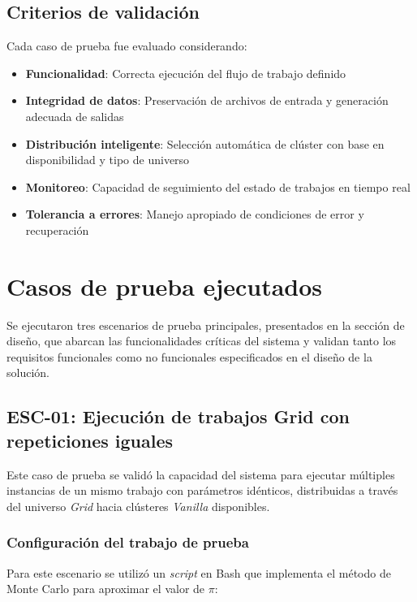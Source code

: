 \subsection{Criterios de validación}
\noindent

Cada caso de prueba fue evaluado considerando:

\begin{itemize}
	\item \textbf{Funcionalidad}: Correcta ejecución del flujo de trabajo definido
	\item \textbf{Integridad de datos}: Preservación de archivos de entrada y generación adecuada de salidas
	\item \textbf{Distribución inteligente}: Selección automática de clúster con base en disponibilidad y tipo de universo
	\item \textbf{Monitoreo}: Capacidad de seguimiento del estado de trabajos en tiempo real
	\item \textbf{Tolerancia a errores}: Manejo apropiado de condiciones de error y recuperación
\end{itemize}

\section{Casos de prueba ejecutados}
\noindent

Se ejecutaron tres escenarios de prueba principales, presentados en la sección de diseño, que abarcan las funcionalidades críticas del sistema y validan tanto los requisitos funcionales como no funcionales especificados en el diseño de la solución.

\subsection{ESC-01: Ejecución de trabajos Grid con repeticiones iguales}
\noindent

Este caso de prueba se validó la capacidad del sistema para ejecutar múltiples instancias de un mismo trabajo con parámetros idénticos, distribuidas a través del universo \textit{Grid} hacia clústeres \textit{Vanilla} disponibles.

\subsubsection{Configuración del trabajo de prueba}
\noindent

Para este escenario se utilizó un \textit{script} en Bash que implementa el método de Monte Carlo para aproximar el valor de $\pi$:

